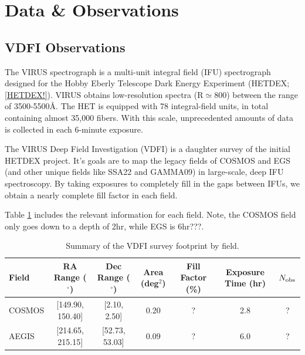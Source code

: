 \documentclass[linenumbers,amsmath,trackchanges,preprint2]{aastex702}
\begin{document}
\section{Data \& Observations}
\subsection{VDFI Observations}
\par The VIRUS spectrograph is a multi-unit integral field (IFU) spectrograph designed for the Hobby Eberly Telescope Dark Energy Experiment (HETDEX; \ref{HETDEX!}). VIRUS obtains low-resolution spectra (R$\simeq$800) between the range of 3500-5500\AA. The HET is equipped with 78 integral-field units, in total containing almost 35,000 fibers. With this scale, unprecedented amounts of data is collected in each 6-minute exposure.
\par The VIRUS Deep Field Investigation (VDFI) is a daughter survey of the initial HETDEX project. It's goals are to map the legacy fields of COSMOS and EGS (and other unique fields like SSA22 and GAMMA09) in large-scale, deep IFU spectroscopy. By taking exposures to completely fill in the gaps between IFUs, we obtain a nearly complete fill factor in each field.
\par Table \ref{tab:VDFI Data by Field} includes the relevant information for each field. Note, the COSMOS field only goes down to a depth of 2hr, while EGS is 6hr???.

\begin{table}
\centering
\caption{Summary of the VDFI survey footprint by field.}
\label{tab:VDFI Data by Field}
\begin{tabular}{lcccccc}
\hline
Field &
RA Range ($^\circ$) &
Dec Range ($^\circ$) &
Area (deg$^2$) &
Fill Factor (\%) &
Exposure Time (hr) &
$N_{\rm obs}$ \\
\hline
COSMOS & [149.90, 150.40] & [2.10, 2.50] & 0.20 & ? & 2.8 & ? \\
AEGIS  & [214.65, 215.15] & [52.73, 53.03] & 0.09 & ? & 6.0 & ? \\
\hline
\end{tabular}
\end{table}
\end{document}
